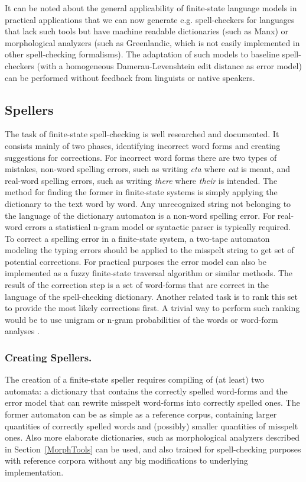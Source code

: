 \documentclass{llncs}
\begin{document}
It can be noted about the general applicability of finite-state
language models in practical applications that we can now generate
e.g. spell-checkers for languages that lack such tools but have machine
readable dictionaries (such as Manx) or morphological analyzers (such as
Greenlandic, which is not easily implemented in other spell-checking formalisms). 
The adaptation of such models to baseline spell-checkers (with a homogeneous 
Damerau-Levenshtein edit distance as error model) can be performed without 
feedback from linguists or native speakers.

\subsection{Spellers}

The task of finite-state spell-checking is well researched and documented. It
consists mainly of two phases, identifying incorrect word forms and creating
suggestions for corrections. For incorrect word forms there are two types of
mistakes, non-word spelling errors, such as writing \emph{cta} where \emph{cat}
is meant, and real-word spelling errors, such as writing \emph{there} where
\emph{their} is intended. The method for finding the former in finite-state systems
is simply applying the dictionary to the text word by word. Any unrecognized
string not belonging to the language of the dictionary automaton is a non-word
spelling error. For real-word errors a statistical n-gram model or syntactic
parser is typically required. To correct a spelling error in a finite-state
system, a two-tape automaton modeling the typing errors should be applied to
the misspelt string to get set of potential corrections\cite{pirinen/2010/lrec}.
For practical purposes the error model can also be implemented as a
fuzzy finite-state traversal algorithm or similar methods\cite{oflazer/1996}. The result
of the correction step is a set of word-forms that are correct in the
language of the spell-checking dictionary. Another related task is to rank this
set to provide the most likely corrections first.
A trivial way to perform such ranking would be to use
unigram \cite{pirinen/2010/lrec} or n-gram probabilities of the words 
\cite{mays/1991} or word-form analyses \cite{pirinen/2012/cicling}.

\subsubsection{Creating Spellers.}

The creation of a finite-state speller requires compiling of (at least) two
automata: a dictionary that contains the correctly spelled word-forms and the
error model that can rewrite misspelt word-forms into correctly spelled ones.
The former automaton can be as simple as a reference corpus, containing larger
quantities of correctly spelled words and (possibly) smaller quantities of
misspelt ones\cite{norvig/2010}. Also more elaborate dictionaries, such as
morphological analyzers described in Section~\ref{MorphTools} can be used, and also
trained for spell-checking purposes with reference corpora without any big
modifications to underlying implementation\cite{pirinen/2010/lrec}.
\end{document}
